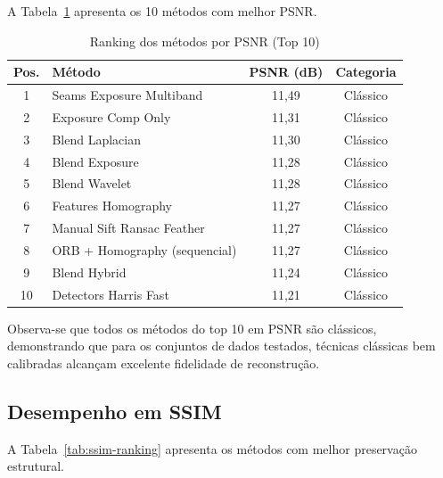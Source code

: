 A Tabela~\ref{tab:psnr-ranking} apresenta os 10 métodos com melhor PSNR.

\begin{table}[htb]
\centering
\caption{Ranking dos métodos por PSNR (Top 10)}
\label{tab:psnr-ranking}
\small
\begin{tabular}{clcc}
\hline
\textbf{Pos.} & \textbf{Método} & \textbf{PSNR (dB)} & \textbf{Categoria} \\ \hline
1 & Seams Exposure Multiband & 11,49 & Clássico \\
2 & Exposure Comp Only & 11,31 & Clássico \\
3 & Blend Laplacian & 11,30 & Clássico \\
4 & Blend Exposure & 11,28 & Clássico \\
5 & Blend Wavelet & 11,28 & Clássico \\
6 & Features Homography & 11,27 & Clássico \\
7 & Manual Sift Ransac Feather & 11,27 & Clássico \\
8 & ORB + Homography (sequencial) & 11,27 & Clássico \\
9 & Blend Hybrid & 11,24 & Clássico \\
10 & Detectors Harris Fast & 11,21 & Clássico \\
\hline
\end{tabular}
\end{table}

Observa-se que todos os métodos do top 10 em PSNR são clássicos, demonstrando que para os conjuntos de dados testados, técnicas clássicas bem calibradas alcançam excelente fidelidade de reconstrução.

\subsection{Desempenho em SSIM}

A Tabela~\ref{tab:ssim-ranking} apresenta os métodos com melhor preservação estrutural.

